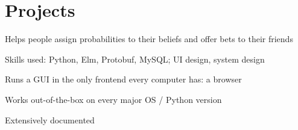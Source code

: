 \documentclass[]{resume}
\begin{document}
\begin{minipage}[t]{0.66\textwidth}
\section{Projects}

\begin{tightemize}
\item Helps people assign probabilities to their beliefs and offer bets to their friends
\item Skills used: Python, Elm, Protobuf, MySQL; UI design, system design
\end{tightemize}
\sectionsep

\begin{tightemize}
\item Runs a GUI in the only frontend every computer has: a browser
\item Works out-of-the-box on every major OS / Python version
\item Extensively documented
\end{tightemize}
\sectionsep


%






\end{minipage}
\end{document}
